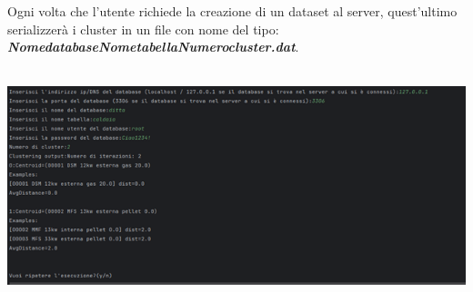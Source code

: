 \begin{enumerate}
\begin{itemize}[label=-]
    Ogni volta che l'utente richiede la creazione di un dataset al server, quest'ultimo serializzerà i cluster in un file con nome del tipo: \textbf{\textit{NomedatabaseNometabellaNumerocluster.dat}}. \\ \\
    \begin{minipage}[t]{0.3\textwidth}
      \includegraphics[scale=0.8]{img/test14.png}
    \end{minipage}
  \end{itemize}
\end{enumerate}